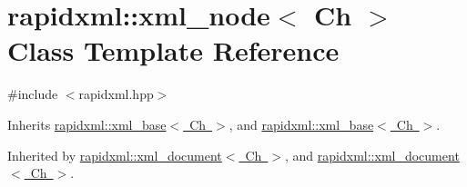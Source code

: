 \hypertarget{classrapidxml_1_1xml__node}{}\section{rapidxml\+:\+:xml\+\_\+node$<$ Ch $>$ Class Template Reference}
\label{classrapidxml_1_1xml__node}


{\ttfamily \#include $<$rapidxml.\+hpp$>$}



Inherits \mbox{\hyperlink{classrapidxml_1_1xml__base}{rapidxml\+::xml\+\_\+base$<$ Ch $>$}}, and \mbox{\hyperlink{classrapidxml_1_1xml__base}{rapidxml\+::xml\+\_\+base$<$ Ch $>$}}.



Inherited by \mbox{\hyperlink{classrapidxml_1_1xml__document}{rapidxml\+::xml\+\_\+document$<$ Ch $>$}}, and \mbox{\hyperlink{classrapidxml_1_1xml__document}{rapidxml\+::xml\+\_\+document$<$ Ch $>$}}.

